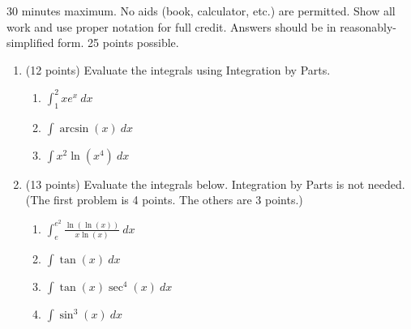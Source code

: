 \documentclass[12pt]{article}
\renewcommand{\d}{\displaystyle}
\begin{document}
30 minutes maximum.  No aids (book, calculator, etc.) are permitted.  Show all work and use proper notation for full credit.  Answers should be in reasonably-simplified form.  25 points possible.

\begin{enumerate}
\item (12 points) Evaluate the integrals using Integration by Parts.
	\begin{enumerate}
	\item  $\d \int_1^2  xe^x \: dx$
	\vfill
	\item $\d \int \arcsin(x) \: dx$
	\vfill
	\item $\d \int x^2 \ln(x^4) \: dx$
	\vfill
	\end{enumerate}

\newpage
\item (13 points) Evaluate the integrals below. Integration by Parts is not needed. (The first problem is 4 points. The others are 3 points.)
	\begin{enumerate}
	\item $\d \int_e^{e^2} \frac{\ln(\ln(x))}{x \ln(x)} \: dx$
	\vfill
	\item $\d \int \tan(x) \: dx$
	\vfill
	\newpage
	\item $\d \int \tan(x)\sec^4(x) \: dx$
	\vfill
	\item $\d \int \sin^3(x) \: dx $
	\vfill
	\end{enumerate}
\end{enumerate}
\end{document}
